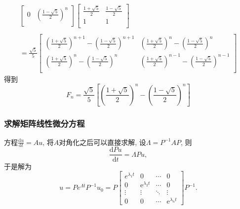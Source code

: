 \begin{example}
\begin{equation}
\begin{aligned}
\begin{bmatrix}
               0 & \left( \frac{1-\sqrt{5}}{2} \right) ^{n}\\
              \end{bmatrix}
              \begin{bmatrix}
               \frac{1+\sqrt{5}}{2} & \frac{1-\sqrt{5}}{2}\\
               1 & 1\\
              \end{bmatrix}
              \\ \\
              =
              \frac{\sqrt{5}}{5}
              \begin{bmatrix}
               \left( \frac{1+\sqrt{5}}{2} \right) ^{n+1} - \left( \frac{1-\sqrt{5}}{2} \right) ^{n+1} &\left( \frac{1+\sqrt{5}}{2} \right) ^{n} - \left( \frac{1-\sqrt{5}}{2} \right) ^{n} \\
               \left( \frac{1+\sqrt{5}}{2} \right) ^{n} - \left( \frac{1-\sqrt{5}}{2} \right) ^{n} & \left( \frac{1+\sqrt{5}}{2} \right) ^{n-1} - \left( \frac{1-\sqrt{5}}{2} \right) ^{n-1}\\
              \end{bmatrix}
          \end{aligned}
    \end{equation}
    得到
    \begin{equation}
      F_n = \frac{\sqrt{5}}{5} \left[ \left( \frac{1+\sqrt{5}}{2} \right) ^{n} - \left( \frac{1-\sqrt{5}}{2} \right)^{n}  \right] 
    \end{equation}
\end{example}

\subsubsection{求解矩阵线性微分方程}
方程$\frac{\mathrm{d}u}{\mathrm{d} t} = Au$, 将$A$对角化之后可以直接求解, 设$\Lambda = P ^{-1} A P$, 则
\begin{equation}
  \frac{\mathrm{d}Pu}{\mathrm{d} t} = \Lambda P u,
\end{equation}
于是解为
\begin{equation}
    u = P e^{\Lambda t} P ^{-1} u_0 = P \begin{bmatrix}
        e^{\lambda_1 t}&0&\cdots&0\\
        0&\mathrm{e}^{\lambda_2 t}&\cdots&0\\
        \vdots&\vdots&\ddots&\vdots\\
        0&0&\cdots&\mathrm{e}^{\lambda_n t}
    \end{bmatrix} P ^{-1}.
\end{equation}


